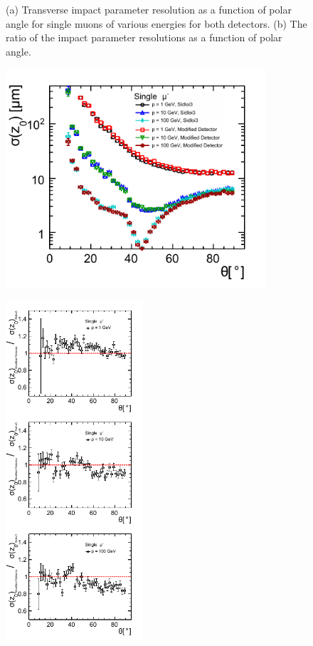 \begin{figure}[h!]
\begin{minipage}{2.0in}
\label{fig:muond0resratio}
\end{minipage}
\caption{(a) Transverse impact parameter resolution as a function of polar angle for single muons of various energies for both detectors.
(b) The ratio of the impact parameter resolutions as a function of polar angle.}
\label{fig:muond0res}
\end{figure}
\begin{figure}[h!]
\begin{minipage}{3.8in}
\centering
\includegraphics[width=3.8in]{muonZ0ResolutionThetaTwoDetectors2.pdf}
\label{fig:muonz0restwodetectors}
\end{minipage}
\begin{minipage}{2.0in}
\centering
\includegraphics[width=2.0in]{muonZ0ResRatio2.pdf}

\end{minipage}
\end{figure}
